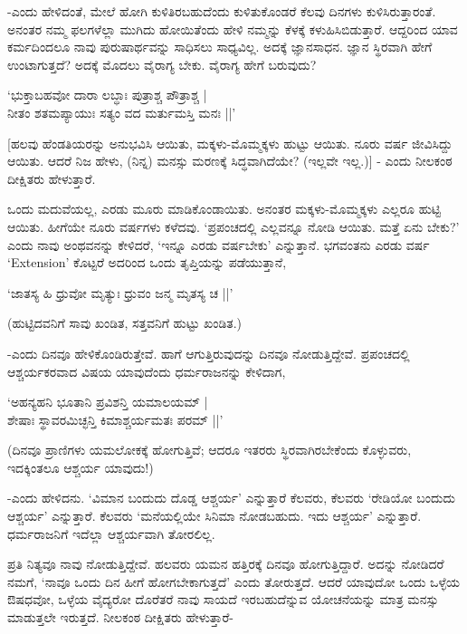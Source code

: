 -ಎಂದು ಹೇಳಿದಂತೆ, ಮೇಲೆ ಹೋಗಿ ಕುಳಿತಿರಬಹುದೆಂದು ಕುಳಿತುಕೊಂಡರೆ ಕೆಲವು ದಿನಗಳು ಕುಳಿಸಿರುತ್ತಾರಂತೆ. ಅನಂತರ ನಮ್ಮ ಫಲಗಳೆಲ್ಲಾ ಮುಗಿದು ಹೋಯಿತೆಂದು ಹೇಳಿ ನಮ್ಮನ್ನು ಕೆಳಕ್ಕೆ ಕಳುಹಿಸಿಬಿಡುತ್ತಾರೆ. ಆದ್ದರಿಂದ ಯಾವ ಕರ್ಮದಿಂದಲೂ ನಾವು ಪುರುಷಾರ್ಥವನ್ನು ಸಾಧಿಸಲು ಸಾಧ್ಯವಿಲ್ಲ. ಅದಕ್ಕೆ ಜ್ಞಾನಸಾಧನ. ಜ್ಞಾನ ಸ್ಥಿರವಾಗಿ ಹೇಗೆ ಉಂಟಾಗುತ್ತದೆ? ಅದಕ್ಕೆ ಮೊದಲು ವೈರಾಗ್ಯ ಬೇಕು. ವೈರಾಗ್ಯ ಹೇಗೆ ಬರುವುದು?

\begin{shloka}
`ಭುಕ್ತಾಬಹವೋ ದಾರಾ ಲಬ್ಧಾಃ ಪುತ್ರಾಶ್ಚ ಪೌತ್ರಾಶ್ಚ |\\
ನೀತಂ ಶತಮಪ್ಯಾಯುಃ ಸತ್ಯಂ ವದ ಮರ್ತುಮಸ್ತಿ ಮನಃ ||'
\end{shloka}

[ಹಲವು ಹೆಂಡತಿಯರನ್ನು ಅನುಭವಿಸಿ ಆಯಿತು, ಮಕ್ಕಳು-ಮೊಮ್ಮಕ್ಕಳು ಹುಟ್ಟು ಆಯಿತು. ನೂರು ವರ್ಷ ಜೀವಿಸಿದ್ದು ಆಯಿತು. ಆದರೆ ನಿಜ ಹೇಳು,  (ನಿನ್ನ) ಮನಸ್ಸು ಮರಣಕ್ಕೆ ಸಿದ್ಧವಾಗಿದೆಯೇ? (ಇಲ್ಲವೇ ಇಲ್ಲ.)] - ಎಂದು ನೀಲಕಂಠ ದೀಕ್ಷಿತರು ಹೇಳುತ್ತಾರೆ.

ಒಂದು ಮದುವೆಯಲ್ಲ, ಎರಡು ಮೂರು ಮಾಡಿಕೊಂಡಾಯಿತು. ಅನಂತರ ಮಕ್ಕಳು-ಮೊಮ್ಮಕ್ಕಳು ಎಲ್ಲರೂ ಹುಟ್ಟಿ ಆಯಿತು. ಹೀಗೆಯೇ ನೂರು ವರ್ಷಗಳು ಕಳೆದವು. `ಪ್ರಪಂಚದಲ್ಲಿ ಎಲ್ಲವನ್ನೂ ನೋಡಿ ಆಯಿತು. ಮತ್ತೆ ಏನು ಬೇಕು?' ಎಂದು ನಾವು ಅಂಥವನನ್ನು ಕೇಳಿದರೆ, `ಇನ್ನೂ ಎರಡು ವರ್ಷಬೇಕು' ಎನ್ನುತ್ತಾನೆ. ಭಗವಂತನು ಎರಡು ವರ್ಷ `{\eng Extension}' ಕೊಟ್ಟರೆ ಅದರಿಂದ ಒಂದು ತೃಪ್ತಿಯನ್ನು ಪಡೆಯುತ್ತಾನೆ,

\begin{shloka}
`ಜಾತಸ್ಯ ಹಿ ಧ್ರುವೋ ಮೃತ್ಯುಃ ಧ್ರುವಂ ಜನ್ಮ ಮೃತಸ್ಯ ಚ ||'
\end{shloka}

(ಹುಟ್ಟಿದವನಿಗೆ ಸಾವು ಖಂಡಿತ, ಸತ್ತವನಿಗೆ ಹುಟ್ಟು ಖಂಡಿತ.)

-ಎಂದು ದಿನವೂ ಹೇಳಿಕೊಂಡಿರುತ್ತೇವೆ. ಹಾಗೆ ಆಗುತ್ತಿರುವುದನ್ನು ದಿನವೂ ನೋಡುತ್ತಿದ್ದೇವೆ. ಪ್ರಪಂಚದಲ್ಲಿ ಆಶ್ಚರ್ಯಕರವಾದ ವಿಷಯ ಯಾವುದೆಂದು ಧರ್ಮರಾಜನನ್ನು ಕೇಳಿದಾಗ,

\begin{shloka}
`ಅಹನ್ಯಹನಿ ಭೂತಾನಿ ಪ್ರವಿಶನ್ತಿ ಯಮಾಲಯಮ್ |\\
ಶೇಷಾಃ ಸ್ಥಾವರಮಿಚ್ಛನ್ತಿ ಕಿಮಾಶ್ಚರ್ಯಮತಃ ಪರಮ್ ||'
\end{shloka}

(ದಿನವೂ ಪ್ರಾಣಿಗಳು ಯಮಲೋಕಕ್ಕೆ ಹೋಗುತ್ತಿವೆ; ಆದರೂ ಇತರರು ಸ್ಥಿರವಾಗಿರಬೇಕೆಂದು ಕೊಳ್ಳುವರು, ಇದಕ್ಕಿಂತಲೂ ಆಶ್ಚರ್ಯ ಯಾವುದು!)

-ಎಂದು ಹೇಳಿದನು. `ವಿಮಾನ ಬಂದುದು ದೊಡ್ಡ ಆಶ್ಚರ್ಯ' ಎನ್ನುತ್ತಾರೆ ಕೆಲವರು, ಕೆಲವರು `ರೇಡಿಯೋ ಬಂದುದು ಆಶ್ಚರ್ಯ' ಎನ್ನುತ್ತಾರೆ. ಕೆಲವರು `ಮನೆಯಲ್ಲಿಯೇ ಸಿನಿಮಾ ನೋಡಬಹುದು. ಇದು ಆಶ್ಚರ್ಯ' ಎನ್ನುತ್ತಾರೆ. ಧರ್ಮರಾಜನಿಗೆ ಇದೆಲ್ಲಾ ಆಶ್ಚರ್ಯವಾಗಿ ತೋರಲಿಲ್ಲ.

ಪ್ರತಿ ನಿತ್ಯವೂ ನಾವು ನೋಡುತ್ತಿದ್ದೇವೆ. ಹಲವರು ಯಮನ ಹತ್ತಿರಕ್ಕೆ ದಿನವೂ ಹೋಗುತ್ತಿದ್ದಾರೆ. ಅದನ್ನು ನೋಡಿದರೆ ನಮಗೆ, `ನಾವೂ ಒಂದು ದಿನ ಹೀಗೆ ಹೋಗಬೇಕಾಗುತ್ತದೆ' ಎಂದು ತೋರುತ್ತದೆ. ಆದರೆ ಯಾವುದೋ ಒಂದು ಒಳ್ಳೆಯ ಔಷಧವೋ, ಒಳ್ಳೆಯ ವೈದ್ಯರೋ ದೊರೆತರೆ ನಾವು ಸಾಯದೆ ಇರಬಹುದೆನ್ನುವ ಯೋಚನೆಯನ್ನು ಮಾತ್ರ ಮನಸ್ಸು ಮಾಡುತ್ತಲೇ ಇರುತ್ತದೆ. ನೀಲಕಂಠ ದೀಕ್ಷಿತರು ಹೇಳುತ್ತಾರೆ-

